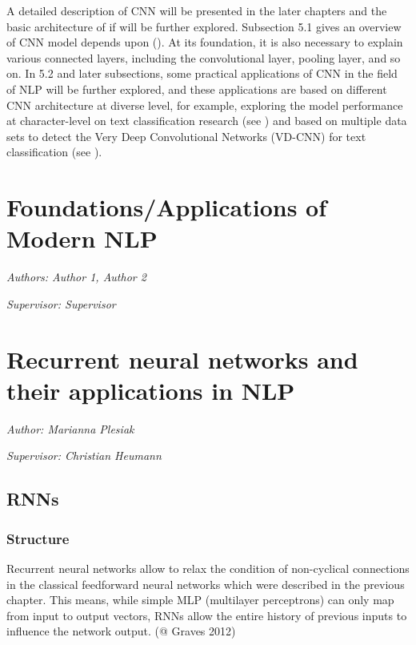\documentclass[]{krantz}
\begin{document}
\newpage

A detailed description of CNN will be presented in the later chapters and the basic architecture of if will be further explored. Subsection 5.1 gives an overview of CNN model depends upon (\citet{Kim2014ConvolutionalNN}). At its foundation, it is also necessary to explain various connected layers, including the convolutional layer, pooling layer, and so on. In 5.2 and later subsections, some practical applications of CNN in the field of NLP will be further explored, and these applications are based on different CNN architecture at diverse level, for example, exploring the model performance at character-level on text classification research (see \citet{Zhang2015CharacterlevelCN}) and based on multiple data sets to detect the Very Deep Convolutional Networks (VD-CNN) for text classification (see \citet{Schwenk2017VeryDC}).

\hypertarget{foundationsapplications-of-modern-nlp}{%
\chapter{Foundations/Applications of Modern NLP}\label{foundationsapplications-of-modern-nlp}}

\emph{Authors: Author 1, Author 2}

\emph{Supervisor: Supervisor}

\hypertarget{recurrent-neural-networks-and-their-applications-in-nlp}{%
\chapter{Recurrent neural networks and their applications in NLP}\label{recurrent-neural-networks-and-their-applications-in-nlp}}

\emph{Author: Marianna Plesiak}

\emph{Supervisor: Christian Heumann}

\hypertarget{rnns}{%
\section{RNNs}\label{rnns}}

\hypertarget{structure}{%
\subsection{Structure}\label{structure}}

Recurrent neural networks allow to relax the condition of non-cyclical connections in the classical feedforward neural networks which were described in the previous chapter. This means, while simple MLP (multilayer perceptrons) can only map from input to output vectors, RNNs allow the entire history of previous inputs to influence the network output. (@ Graves 2012)
\end{document}
